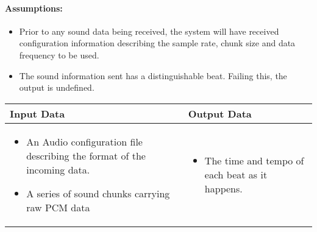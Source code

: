 \documentclass[english,12pt]{scrartcl}
\begin{document}
		\paragraph{Assumptions:}
		\begin{itemize}
			\item Prior to any sound data being received, the system will have received configuration information describing the sample rate, chunk size and data frequency to be used.
			\item The sound information sent has a distinguishable beat. Failing this, the output is undefined.
		\end{itemize}

		\begin{tabular}{p{7cm}|p{7cm}}
    			\textbf{Input Data} & \textbf{Output Data} \\ \hline
			\begin{itemize}
				\item An Audio configuration file describing the format of the incoming data.
				\item A series of sound chunks carrying raw PCM data
			\end{itemize}
			&
			\begin{itemize}
				\item The time and tempo of each beat as it happens.
			\end{itemize}
		\end{tabular}
\end{document}
